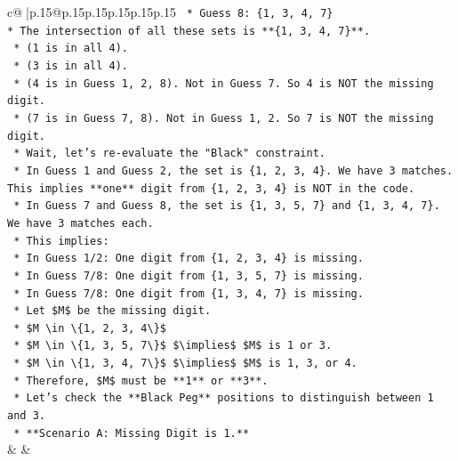 \documentclass{article}
\begin{document}
{\begin{supertabular}{c@{$\;$}|p{.15\linewidth}@{}p{.15\linewidth}p{.15\linewidth}p{.15\linewidth}p{.15\linewidth}p{.15\linewidth}}
{{{\texttt{    *   Guess 8: \{1, 3, 4, 7\}} \\
\texttt{*   The intersection of all these sets is **\{1, 3, 4, 7\}**.} \\
\texttt{    *   (1 is in all 4).} \\
\texttt{    *   (3 is in all 4).} \\
\texttt{    *   (4 is in Guess 1, 2, 8). Not in Guess 7. So 4 is NOT the missing digit.} \\
\texttt{    *   (7 is in Guess 7, 8). Not in Guess 1, 2. So 7 is NOT the missing digit.} \\
\texttt{    *   Wait, let's re{-}evaluate the "Black" constraint.} \\
\texttt{    *   In Guess 1 and Guess 2, the set is \{1, 2, 3, 4\}. We have 3 matches. This implies **one** digit from \{1, 2, 3, 4\} is NOT in the code.} \\
\texttt{    *   In Guess 7 and Guess 8, the set is \{1, 3, 5, 7\} and \{1, 3, 4, 7\}. We have 3 matches each.} \\
\texttt{    *   This implies:} \\
\texttt{        *   In Guess 1/2: One digit from \{1, 2, 3, 4\} is missing.} \\
\texttt{        *   In Guess 7/8: One digit from \{1, 3, 5, 7\} is missing.} \\
\texttt{        *   In Guess 7/8: One digit from \{1, 3, 4, 7\} is missing.} \\
\texttt{    *   Let \$M\$ be the missing digit.} \\
\texttt{        *   \$M \textbackslash{}in \textbackslash{}\{1, 2, 3, 4\textbackslash{}\}\$} \\
\texttt{        *   \$M \textbackslash{}in \textbackslash{}\{1, 3, 5, 7\textbackslash{}\}\$ \$\textbackslash{}implies\$ \$M\$ is 1 or 3.} \\
\texttt{        *   \$M \textbackslash{}in \textbackslash{}\{1, 3, 4, 7\textbackslash{}\}\$ \$\textbackslash{}implies\$ \$M\$ is 1, 3, or 4.} \\
\texttt{    *   Therefore, \$M\$ must be **1** or **3**.} \\
\texttt{    *   Let's check the **Black Peg** positions to distinguish between 1 and 3.} \\
\texttt{        *   **Scenario A: Missing Digit is 1.**} \\
            }
        }
    }
    & & \\ \\


\end{supertabular}}
\end{document}
